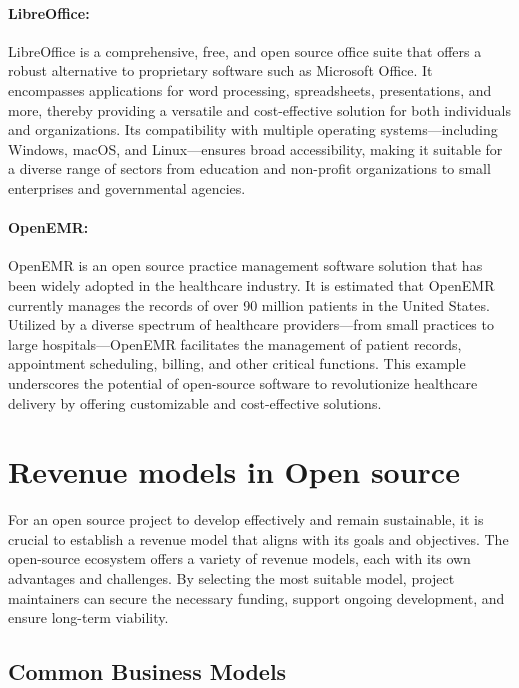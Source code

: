 \paragraph{LibreOffice:}  
LibreOffice is a comprehensive, free, and open source office suite that offers a robust alternative to proprietary software such as Microsoft Office. It encompasses applications for word processing, spreadsheets, presentations, and more, thereby providing a versatile and cost-effective solution for both individuals and organizations. Its compatibility with multiple operating systems—including Windows, macOS, and Linux—ensures broad accessibility, making it suitable for a diverse range of sectors from education and non-profit organizations to small enterprises and governmental agencies.

\paragraph{OpenEMR:}  
OpenEMR is an open source practice management software solution that has been widely adopted in the healthcare industry. It is estimated that OpenEMR currently manages the records of over 90 million patients in the United States. Utilized by a diverse spectrum of healthcare providers—from small practices to large hospitals—OpenEMR facilitates the management of patient records, appointment scheduling, billing, and other critical functions. This example underscores the potential of open-source software to revolutionize healthcare delivery by offering customizable and cost-effective solutions.

\cite{Open-Source-EMR-Software}

\section{Revenue models in Open source}

For an open source project to develop effectively and remain sustainable, it is crucial to establish a revenue model that aligns with its goals and objectives. The open-source ecosystem offers a variety of revenue models, each with its own advantages and challenges. By selecting the most suitable model, project maintainers can secure the necessary funding, support ongoing development, and ensure long-term viability.

\subsection{Common Business Models}

